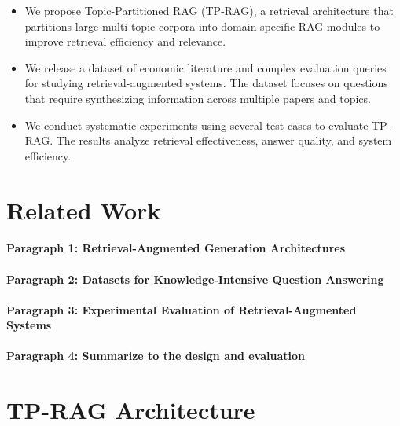 \documentclass[11pt]{article}
\begin{document}
\begin{itemize}
    \item We propose Topic-Partitioned RAG (TP-RAG), a retrieval architecture that partitions large multi-topic corpora into domain-specific RAG modules to improve retrieval efficiency and relevance.

    \item We release a dataset of economic literature and complex evaluation queries for studying retrieval-augmented systems. The dataset focuses on questions that require synthesizing information across multiple papers and topics.
    
    \item We conduct systematic experiments using several test cases to evaluate TP-RAG. The results analyze retrieval effectiveness, answer quality, and system efficiency.

\end{itemize}


\section{Related Work} \label{sec:related_works}


\paragraph{Paragraph 1: Retrieval-Augmented Generation Architectures}

\paragraph{Paragraph 2: Datasets for Knowledge-Intensive Question Answering}

\paragraph{Paragraph 3: Experimental Evaluation of Retrieval-Augmented Systems}

\paragraph{Paragraph 4: Summarize to the design and evaluation}






\section{TP-RAG Architecture}
\end{document}
